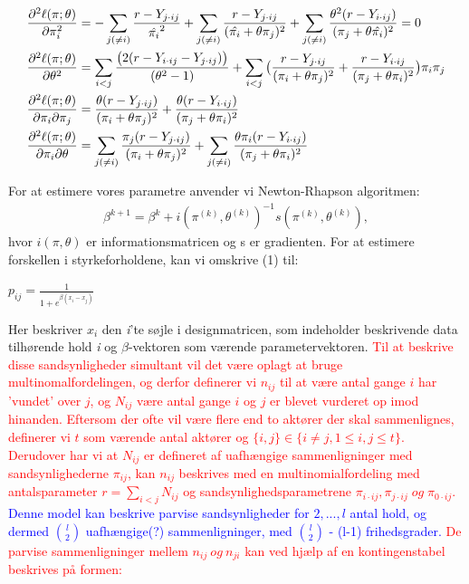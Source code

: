 \documentclass[11pt,a4paper]{article}
\begin{document}
\begin{equations} 
\begin{align}
\frac{\partial^2 \ell(\pi;\theta)}{\partial \pi_i^2}&= 
-\sum_{j(\neq i)}\frac{r-Y_{j\cdot ij}}{\hat{\pi_i}^2}+\sum_{j(\neq i)}\frac{r-Y_{j\cdot ij}}{(\hat{\pi_i}+\theta \pi_j)^2}+\sum_{j(\neq i)}\frac{\theta^2 (r-Y_{i\cdot ij})}{(\pi_j+\theta \hat{\pi_i})^2}=0\\
\frac{\partial^2 \ell(\pi;\theta)}{\partial \theta^2}&=
\sum_{i<j}\frac{\big{(}2(r-Y_{i\cdot ij}-Y_{j\cdot ij})\big{)}}{(\theta^2-1)}
+\sum_{i<j}\big{(}\frac{r-Y_{j\cdot ij}}{(\pi_i+\theta \pi_j)^2}+\frac{r-Y_{i \cdot ij}}{(\pi_j+\theta \pi_i)^2}\big{)}\pi_i\pi_j\\
\frac{\partial^2 \ell(\pi;\theta)}{\partial \pi_i \partial \pi_j}&=
\frac{\theta(r-Y_{j\cdot ij})}{(\pi_i+\theta\pi_j)^2}+\frac{\theta(r-Y_{i\cdot ij})}{(\pi_j+\theta\pi_i)^2}\\
\frac{\partial^2 \ell(\pi;\theta)}{\partial\pi_i\partial\theta}&=
\sum_{j(\neq i)}\frac{\pi_j(r-Y_{j\cdot ij})}{(\pi_i+\theta\pi_j)^2}
+\sum_{j(\neq i)}\frac{\theta\pi_i(r-Y_{i\cdot ij})}{(\pi_j+\theta\pi_i)^2}
\end{align}
\end{equations}
For at estimere vores parametre anvender vi Newton-Rhapson algoritmen:
\begin{align*}
    \beta^{k+1}=\beta^k+i(\pi^{(k)},\theta^{(k)})^{-1}s(\pi^{(k)},\theta^{(k)}),
\end{align*}
hvor $i(\pi,\theta)$ er informationsmatricen og s er gradienten.
For at estimere forskellen i styrkeforholdene, kan vi omskrive (1) til:
\begin{center}
$p_{ij} = \frac{1}{1+e^{\beta(x_i-x_j)}}$
\end{center}
Her beskriver $x_i$ den \textit{i}'te søjle i designmatricen, som indeholder beskrivende data tilhørende hold \textit{i} og $\beta$-vektoren som værende parametervektoren. 
\newpage
\textcolor{red}{
Til at beskrive disse sandsynligheder simultant vil det være oplagt at bruge multinomalfordelingen, og derfor definerer vi $n_{ij}$ til at være antal gange $i$ har 'vundet' over $j$, og $N_{ij}$ være antal gange $i$ og $j$ er blevet vurderet op imod hinanden. Eftersom der ofte vil være flere end to aktører der skal sammenlignes, definerer vi $t$ som værende antal aktører og $\{i,j\} \in \{i \neq j, 1 \leq i, j \leq t\}$. Derudover har vi at $N_{ij}$ er defineret af uafhængige sammenligninger med sandsynlighederne $\pi_{ij}$, kan $n_{ij}$ beskrives med en multinomialfordeling med antalsparameter $r = \sum_{i < j} N_{ij}$ og sandsynlighedsparametrene $\pi_{i\cdot ij},\pi_{j\cdot ij} \; og \; \pi_{0\cdot ij}$. \textcolor{blue}{Denne model kan beskrive parvise sandsynligheder for $2,...,l$ antal hold, og dermed $\binom{l}{2}$ uafhængige(?) sammenligninger, med $\binom{l}{2}$ - (l-1) frihedsgrader.} De parvise sammenligninger mellem $n_{ij} \ og \ n_{ji}$ kan ved hjælp af en kontingenstabel beskrives på formen:
}
\end{document}
